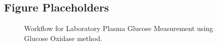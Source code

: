 \documentclass[12pt,a4paper]{article}  %
\begin{document}
\subsection{Figure Placeholders}


\begin{figure}[h!]
\centering
{}
\caption{Workflow for Laboratory Plasma Glucose Measurement using Glucose Oxidase method.}
\label{fig:glucoseoxidase}
\end{figure}



\end{document}

